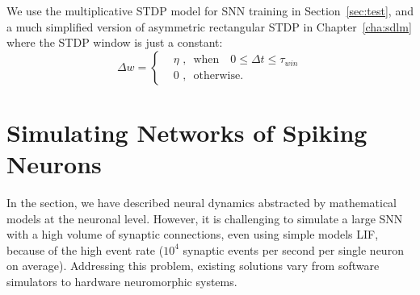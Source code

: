 We use the multiplicative STDP model for SNN training in Section~\ref{sec:test}, and a much simplified version of asymmetric rectangular STDP in Chapter~\ref{cha:sdlm} where the STDP window is just a constant:
\begin{equation}
\Delta w = \left\{
\begin{aligned}
&\eta \textrm{~,~~when~~~} 0 \leq \Delta  t \leq \tau_{win}\\
& 0 \textrm{~,~~otherwise}.
\end{aligned}
\right.
\end{equation}

\section{Simulating Networks of Spiking Neurons}
\label{sec:snn_sim}
In the \DIFdelbegin {}\DIFdelend \DIFaddbegin {}\DIFaddend section, we have described neural dynamics \DIFdelbegin {}\DIFdelend \DIFaddbegin {}\DIFaddend abstracted by mathematical models at the neuronal level.
However, it is challenging to simulate a large SNN with a high volume of synaptic connections, even using simple models \DIFdelbegin {}\DIFdelend \DIFaddbegin {}\DIFaddend LIF, because of the high event rate ($10^4$ synaptic events per second per single neuron on average).
Addressing this problem, existing solutions vary from software simulators to hardware neuromorphic systems.

